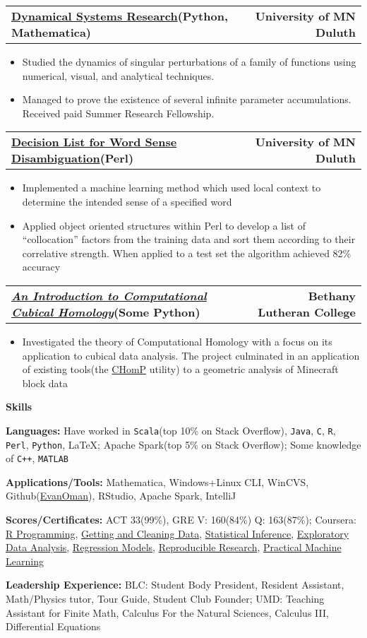 \documentclass[letterpaper,10pt]{article}
\newcommand{\myitem}{\item[$\triangleright$]}
\newcommand{\resHeading}[1]{
	{
		\begin{tcolorbox}[size=title, sharp corners, colback=mygrey, colframe=mygrey]%
			\centering\textbf{\large #1}
		\end{tcolorbox} 
	}
}
\newcommand{\twoColResSubHeading}[2]{
	\begin{tabularx}{\columnwidth}{Xr}
			\textbf{#1} & \textbf{#2}
	\end{tabularx}
}
\begin{document}
		\twoColResSubHeading{\href{https://www.researchgate.net/publication/281248352_Infinite_Levels_of_Complexity_in_a_Family_of_One-Dimensional_Singular_Dynamical_Systems}{Dynamical Systems Research}(Python, Mathematica)}{University of MN Duluth}
			\begin{itemize}
				\myitem Studied the dynamics of singular perturbations of a family of functions using numerical, visual, and analytical techniques.
				\myitem Managed to prove the existence of several infinite parameter accumulations. Received paid Summer Research Fellowship.
			\end{itemize}
		\twoColResSubHeading{\href{https://github.com/EvanOman/nlp-decision-list}{Decision List for Word Sense Disambiguation}(Perl)}{University of MN Duluth}
			\begin{itemize}
				\myitem Implemented a machine learning method which used local context to determine the intended sense of a specified word
				\myitem Applied object oriented structures within Perl to develop a list of ``collocation'' factors from the training data and sort them according to their correlative strength. When applied to a test set the algorithm achieved 82\% accuracy
			\end{itemize}
		\twoColResSubHeading{\href{https://drive.google.com/file/d/0B5IOv9SzzDlvdnowZVpKRzhXOU0/edit?usp=sharing}{\textit{An Introduction to Computational Cubical Homology}}(Some Python)}{Bethany Lutheran College}
			\begin{itemize}
				\myitem Investigated the theory of Computational Homology with a focus on its application to cubical data analysis. The project culminated in an application of existing tools(the \href{http://chomp.rutgers.edu/}{CHomP} utility) to a geometric analysis of Minecraft block data
			\end{itemize}
	\resHeading{Skills}
		\justifying
		\textbf{Languages:}
			Have worked in \verb!Scala!(top 10\% on Stack Overflow), \verb!Java!, \verb!C!, \verb!R!, \verb!Perl!, \verb!Python!, \LaTeX; Apache Spark(top 5\% on Stack Overflow); Some knowledge of \verb!C++!, \verb!MATLAB!

		\textbf{Applications/Tools:}
		Mathematica, Windows+Linux CLI, WinCVS, Github(\href{https://www.github.com/EvanOman}{EvanOman}), RStudio, Apache Spark, IntelliJ

		\textbf{Scores/Certificates:}
		ACT 33(99\%), GRE V: 160(84\%) Q: 163(87\%); Coursera: \href{https://www.coursera.org/account/accomplishments/records/cxq3vN5HB76be56t}{R Programming}, \href{https://www.coursera.org/account/accomplishments/records/Xt3sCA24Qz3Par7M}{Getting and Cleaning Data}, \href{https://www.coursera.org/account/accomplishments/records/yPex7nURcXCYdsse}{Statistical Inference}, \href{https://www.coursera.org/account/accomplishments/records/XMkgJcmHPGtNBXsU}{Exploratory Data Analysis}, \href{https://www.coursera.org/account/accomplishments/records/Qx8qaDCvw9ZNQtqP}{Regression Models}, \href{https://www.coursera.org/account/accomplishments/records/g5LfcvAD5rJuEnGX}{Reproducible Research},
		\href{https://www.coursera.org/account/accomplishments/verify/ZNTJVMJKSH}{Practical Machine Learning}

		\textbf{Leadership Experience:}
		BLC: Student Body President, Resident Assistant, Math/Physics tutor, Tour Guide, Student Club Founder; UMD: Teaching Assistant for Finite Math, Calculus For the Natural Sciences, Calculus III, Differential Equations
\end{document}
